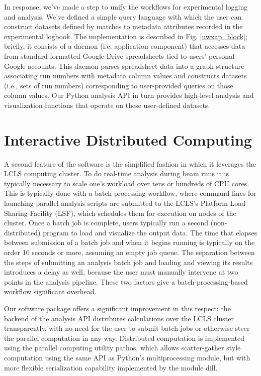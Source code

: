 In response, we've made a step to unify the workflows for experimental logging and analysis. We've defined a simple query language with which the user can construct datasets defined by matches to metadata attributes recorded in the experimental logbook. The implementation is described in Fig. \ref{uwxap_block}; briefly, it consists of a daemon (i.e. application component) that accesses data from standard-formatted Google Drive spreadsheets tied to users' personal Google accounts. This daemon parses spreadsheet data into a graph structure associating run numbers with metadata column values and constructs datasets (i.e., sets of run numbers) corresponding to user-provided queries on those column values. Our Python analysis API in turn provides high-level analysis and visualization functions that operate on these user-defined datasets.

\section{Interactive Distributed Computing}
A second feature of the software is the simplified fashion in which it leverages the LCLS computing cluster. To do real-time analysis during beam runs it is typically necessary to scale one's workload over tens or hundreds of CPU cores. This is typically done with a batch processing workflow, where command lines for launching parallel analysis scripts are submitted to the LCLS's Platform Load Sharing Facility (LSF), which schedules them for execution on nodes of the cluster. Once a batch job is complete, users typically run a second (non-distributed) program to load and visualize the output data. The time that elapses between submission of a batch job and when it begins running is typically on the order 10 seconds or more, assuming an empty job queue. The separation between the steps of submitting an analysis batch job and loading and viewing its results introduces a delay as well, because the user must manually intervene at two points in the analysis pipeline. These two factors give a batch-processing-based workflow significant overhead. 

Our software package offers a significant improvement in this respect: the backend of the analysis API distributes calculations over the LCLS cluster transparently, with no need for the user to submit batch jobs or otherwise steer the parallel computation in any way. Distributed computation is implemented using the parallel computing utility pathos, which allows scatter-gather style computation using the same API as Python's multiprocessing module, but with more flexible serialization capability implemented by the module dill. 


